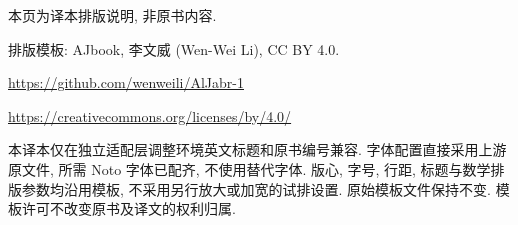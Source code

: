 \documentclass[draftmark=false,colors=true,fontsetup=feec-fonts.tex,titlesetup=titles-setup.tex]{AJbook}
\begin{document}
\clearpage\thispagestyle{empty}\vspace*{\fill}
{\small\noindent 本页为译本排版说明, 非原书内容.\par
排版模板: AJbook, 李文威 (Wen-Wei Li), CC BY 4.0.\par
\url{https://github.com/wenweili/AlJabr-1}\par
\url{https://creativecommons.org/licenses/by/4.0/}\par
本译本仅在独立适配层调整环境英文标题和原书编号兼容.
字体配置直接采用上游原文件, 所需 Noto 字体已配齐, 不使用替代字体.
版心, 字号, 行距, 标题与数学排版参数均沿用模板, 不采用另行放大或加宽的试排设置.
原始模板文件保持不变. 模板许可不改变原书及译文的权利归属.}
\end{document}

